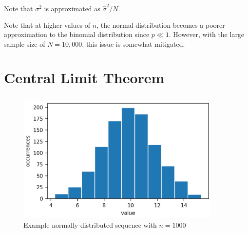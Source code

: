 \documentclass[11pt]{article}
\begin{document}
Note that $\sigma^2$ is approximated as $\hat{\sigma}^2/N$.

Note that at higher values of $n$, the normal distribution becomes a poorer approximation
to the binomial distribution since $p \ll 1$. However, with the large sample size of
$N=10,000$, this issue is somewhat mitigated.

\section{Central Limit Theorem}

\subsection{}  %
\begin{figure}[H]
    \centering
    \includegraphics[width=4in]{4afig1.png}
    \caption{Example normally-distributed sequence with $n=1000$}
    \label{4afig1}
\end{figure}
\end{document}
